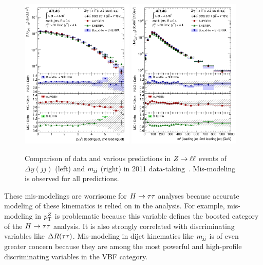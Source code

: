 \begin{figure}[tp]
  \centering
  \includegraphics[width=0.48\textwidth]{figures/STDM-2012-04/fig_11a}
  \includegraphics[width=0.48\textwidth]{figures/STDM-2012-04/fig_11b}
  \caption{Comparison of data and various predictions in $Z \rightarrow \ell\ell$ events of $\Delta y(jj)$ (left) and $m_{\text{jj}}$ (right) in 2011 data-taking~\cite{STDM-2012-04}. Mis-modeling is observed for all predictions.}
  \label{fig:backgrounds-zjj}
\end{figure}

These mis-modelings are worrisome for $H\rightarrow\tau\tau$ analyses because accurate modeling of these kinematics is relied on in the analysis. For example, mis-modeling in $p_{\mathrm{T}}^Z$ is problematic because this variable defines the boosted category of the $H\rightarrow\tau\tau$ analysis. It is also strongly correlated with discriminating variables like $\Delta R(\tau\tau)$. Mis-modeling in dijet kinematics like $m_{\text{jj}}$ is of even greater concern because they are among the most powerful and high-profile discriminating variables in the VBF category.

